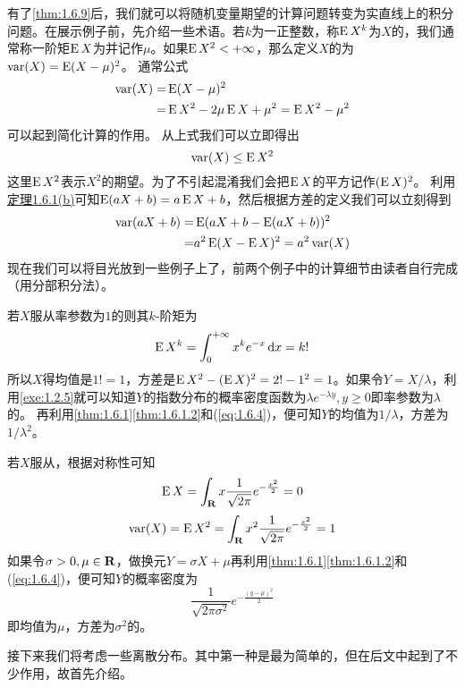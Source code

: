 \documentclass[../main.tex]{subfiles}
\begin{document}
有了\ref{thm:1.6.9}后，我们就可以将随机变量期望的计算问题转变为实直线上的积分问题。在展示例子前，先介绍一些术语。若\(k\)为一正整数，称\(\operatorname{E} X^k\)为\(X\)的，我们通常称一阶矩\(\operatorname{E} X\)为并记作\(\mu\)。如果\(\operatorname{E} X^2<+\infty\)，那么定义\(X\)的为\(\operatorname{var}(X)=\operatorname{E}(X-\mu)^2\)。
通常公式
\begin{equation}\begin{split}
	\operatorname{var}(X)=&\operatorname{E}(X-\mu)^2\\
	=&\operatorname{E} X^2-2\mu\operatorname{E} X+\mu^2=\operatorname{E} X^2-\mu^2
\end{split}\end{equation}
可以起到简化计算的作用。
从上式我们可以立即得出
\begin{equation}
	\operatorname{var}(X)\leq \operatorname{E} X^2
\end{equation}
这里\(\operatorname{E} X^2\)表示\(X^2\)的期望。为了不引起混淆我们会把\(\operatorname{E} X\)的平方记作\((\operatorname{E} X)^2\)。
利用\hyperref[thm:1.6.1.2]{定理1.6.1(b)}可知\(\operatorname{E}(aX+b)=a\operatorname{E} X + b\)，然后根据方差的定义我们可以立刻得到
\begin{equation} \label{eq:1.6.4}
\begin{split}
	\operatorname{var}(aX+b)=&\operatorname{E}(aX+b-\operatorname{E}(aX+b))^2\\
	=&a^2\operatorname{E}(X-\operatorname{E} X)^2=a^2\operatorname{var}(X)
\end{split}
\end{equation}
现在我们可以将目光放到一些例子上了，前两个例子中的计算细节由读者自行完成（用分部积分法）。
\begin{example}
若\(X\)服从率参数为\(1\)的则其\(k\)-阶矩为
\[\E X^k=\int_0^{+\infty}x^ke^{-x}\dif x=k!\]
所以\(X\)得均值是\(1!=1\)，方差是\(\operatorname{E} X^2-(\operatorname{E} X)^2=2!-1^2=1\)。如果令\(Y=X/\lambda\)，利用\ref{exe:1.2.5}就可以知道\(Y\)的指数分布的概率密度函数为\(\lambda e^{-\lambda y},y\geq0\)即率参数为\(\lambda\)的。
再利用\autoref{thm:1.6.1}\ref{thm:1.6.1.2}和(\ref{eq:1.6.4})，便可知\(Y\)的均值为\(1/\lambda\)，方差为\(1/\lambda^2\)。
\end{example}
\begin{example}
若\(X\)服从，根据对称性可知
\[\operatorname{E} X=\int_{\mathbf{R}}x\frac{1}{\sqrt{2\pi}}e^{-\frac{x^2}{2}}=0\]
\[\operatorname{var}(X)=\operatorname{E} X^2=\int_{\mathbf{R}}x^2\frac{1}{\sqrt{2\pi}}e^{-\frac{x^2}{2}}=1\]
如果令\(\sigma>0,\mu\in\mathbf{R}\)，做换元\(Y=\sigma X+\mu\)再利用\autoref{thm:1.6.1}\ref{thm:1.6.1.2}和(\ref{eq:1.6.4})，便可知\(Y\)的概率密度为
\[\frac{1}{\sqrt{2\pi\sigma^2}}e^{-\frac{(y-\mu)^2}{2}}\]
即均值为\(\mu\)，方差为\(\sigma^2\)的。
\end{example}
接下来我们将考虑一些离散分布。其中第一种是最为简单的，但在后文中起到了不少作用，故首先介绍。
\end{document}
